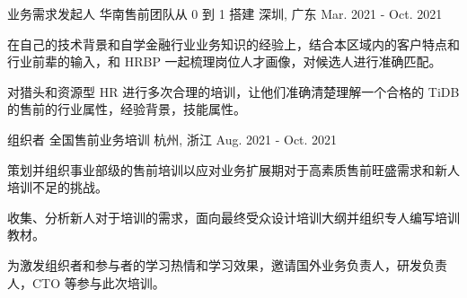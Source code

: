 \begin{cventries}
\cventry
    { 业务需求发起人 } %
    {华南售前团队从 0 到 1 搭建} %
    {深圳, 广东} %
    {Mar. 2021 - Oct. 2021} %
    {
      \begin{cvitems} %
        \item {在自己的技术背景和自学金融行业业务知识的经验上，结合本区域内的客户特点和行业前辈的输入，和 HRBP 一起梳理岗位人才画像，对候选人进行准确匹配。}
        \item {对猎头和资源型 HR 进行多次合理的培训，让他们准确清楚理解一个合格的 TiDB 的售前的行业属性，经验背景，技能属性。}
      \end{cvitems}
    }

\cventry
    { 组织者 } %
    {全国售前业务培训} %
    {杭州, 浙江} %
    {Aug. 2021 - Oct. 2021} %
    {
      \begin{cvitems} %
        \item {策划并组织事业部级的售前培训以应对业务扩展期对于高素质售前旺盛需求和新人培训不足的挑战。}
        \item {收集、分析新人对于培训的需求，面向最终受众设计培训大纲并组织专人编写培训教材。}
        \item {为激发组织者和参与者的学习热情和学习效果，邀请国外业务负责人，研发负责人，CTO 等参与此次培训。 }
      \end{cvitems}
    }

\end{cventries}
